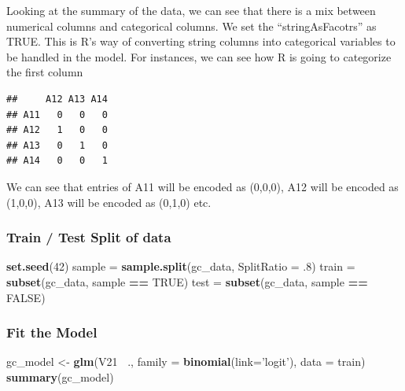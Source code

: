 \documentclass[]{article}
\newenvironment{Shaded}{\begin{snugshade}}{\end{snugshade}}
\newcommand{\KeywordTok}[1]{\textcolor[rgb]{0.13,0.29,0.53}{\textbf{#1}}}
\newcommand{\DataTypeTok}[1]{\textcolor[rgb]{0.13,0.29,0.53}{#1}}
\newcommand{\DecValTok}[1]{\textcolor[rgb]{0.00,0.00,0.81}{#1}}
\newcommand{\StringTok}[1]{\textcolor[rgb]{0.31,0.60,0.02}{#1}}
\newcommand{\OtherTok}[1]{\textcolor[rgb]{0.56,0.35,0.01}{#1}}
\newcommand{\OperatorTok}[1]{\textcolor[rgb]{0.81,0.36,0.00}{\textbf{#1}}}
\newcommand{\NormalTok}[1]{#1}
\begin{document}
Looking at the summary of the data, we can see that there is a mix
between numerical columns and categorical columns. We set the
``stringAsFacotrs'' as TRUE. This is R's way of converting string
columns into categorical variables to be handled in the model. For
instances, we can see how R is going to categorize the first column

\begin{Shaded}
\end{Shaded}

\begin{verbatim}
##     A12 A13 A14
## A11   0   0   0
## A12   1   0   0
## A13   0   1   0
## A14   0   0   1
\end{verbatim}

We can see that entries of A11 will be encoded as (0,0,0), A12 will be
encoded as (1,0,0), A13 will be encoded as (0,1,0) etc.

\subsubsection{Train / Test Split of
data}\label{train-test-split-of-data}

\begin{Shaded}
\begin{Highlighting}[]
\KeywordTok{set.seed}\NormalTok{(}\DecValTok{42}\NormalTok{)}
\NormalTok{sample =}\StringTok{ }\KeywordTok{sample.split}\NormalTok{(gc_data, }\DataTypeTok{SplitRatio =}\NormalTok{ .}\DecValTok{8}\NormalTok{)}
\NormalTok{train =}\StringTok{ }\KeywordTok{subset}\NormalTok{(gc_data, sample }\OperatorTok{==}\StringTok{ }\OtherTok{TRUE}\NormalTok{)}
\NormalTok{test =}\StringTok{ }\KeywordTok{subset}\NormalTok{(gc_data, sample }\OperatorTok{==}\StringTok{ }\OtherTok{FALSE}\NormalTok{)}
\end{Highlighting}
\end{Shaded}

\subsubsection{Fit the Model}\label{fit-the-model}

\begin{Shaded}
\begin{Highlighting}[]
\NormalTok{gc_model <-}\StringTok{ }\KeywordTok{glm}\NormalTok{(V21 }\OperatorTok{~}\NormalTok{., }\DataTypeTok{family =} \KeywordTok{binomial}\NormalTok{(}\DataTypeTok{link=}\StringTok{'logit'}\NormalTok{), }\DataTypeTok{data =}\NormalTok{ train)}
\KeywordTok{summary}\NormalTok{(gc_model)}
\end{Highlighting}
\end{Shaded}
\end{document}
